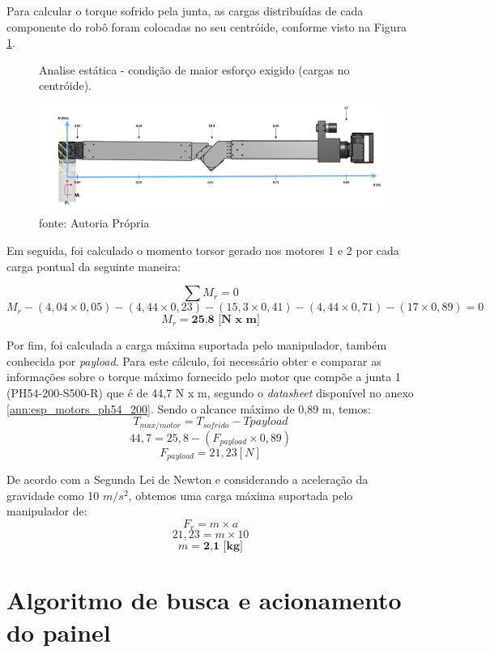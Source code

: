 \documentclass[
12pt,					%
openright,				%
twoside,				%
a4paper,				%
english,
brazil
]{ABNT/abntex2_report}
\begin{document}
	Para calcular o torque sofrido pela junta, as cargas distribuídas de cada componente do robô foram colocadas no seu centróide, conforme visto na Figura \ref{fig:esfoco_m}. 

	\begin{figure}[H]
		\centering
		\caption{Analise estática - condição de maior esforço exigido (cargas no centróide).}
		\includegraphics[width=1\textwidth]{appendix/esforcom.png}
		\caption*{fonte: Autoria Própria}
		\label{fig:esfoco_m}
	\end{figure}

	Em seguida, foi calculado o momento torsor gerado nos motores 1 e 2 por cada carga pontual da seguinte maneira: 

	$$\sum M_{r} = 0 $$
	$$M_{r} - (4,04\times0,05) - (4,44\times0,23) - (15,3\times0,41) - (4,44\times0,71) - (17\times0,89) = 0$$
	$$M_{r} = \textbf{25,8 [N x m]} $$

	Por fim, foi calculada a carga máxima suportada pelo manipulador, também conhecida por \textit{payload}. Para este cálculo, foi necessário obter e comparar as informações sobre o torque máximo fornecido pelo motor que compõe a junta 1 (PH54-200-S500-R) que é de 44,7 N x m, segundo o \textit{datasheet} disponível no anexo \ref{ann:esp_motors_ph54_200}. Sendo o alcance máximo de 0,89 m, temos:
	$$T_{max/motor}= T_{sofrido} - T{payload}$$
	$$44,7 = 25,8 - (F_{payload}\times0,89)$$
	$$F_{payload}= 21,23 [N]$$

	De acordo com a Segunda Lei de Newton e considerando a aceleração da gravidade como 10 $m/s^{2}$, obtemos uma carga máxima suportada pelo manipulador de:
	$$F_{r} = m \times a $$
	$$21,23 = m \times 10$$
	$$m = \textbf{2,1 [kg]}$$



	\chapter{Algoritmo de busca e acionamento do painel}
	\label{apend:algorit}

	
	
\end{document}
